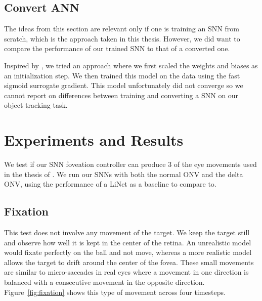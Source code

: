 \documentclass [MS] {UCLAthesis}
\begin{document}

\section{Convert ANN}

The ideas from this section are relevant only if one is training an SNN from scratch, which is the approach taken in this thesis. However, we did want to compare the performance of our trained SNN to that of a converted one.

Inspired by \citet{rathi2020enabling}, we tried an approach where we first scaled the weights and biases as an initialization step. We then trained this model on the data using the fast sigmoid surrogate gradient. This model unfortunately did not converge so we cannot report on differences between training and converting a SNN on our object tracking task.


\chapter{Experiments and Results}

We test if our SNN foveation controller can produce 3 of the eye movements used in the thesis of \cite{Arjun}. We run our SNNs with both the normal ONV and the delta ONV, using the performance of a  LiNet as a baseline to compare to.


\section{Fixation}

This test does not involve any movement of the target. We keep the target still and observe how well it is kept in the center of the retina. An unrealistic model would fixate perfectly on the ball and not move, whereas a more realistic model allows the target to drift around the center of the fovea. These small movements are similar to micro-saccades in real eyes where a movement in one direction is balanced with a consecutive movement in the opposite direction. Figure~\ref{fig:fixation} shows this type of movement across four timesteps.

\end{document}
